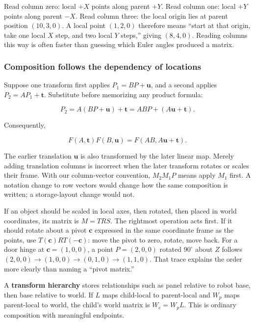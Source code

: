 Read column zero: local \(+X\) points along parent \(+Y\). Read column one: local \(+Y\) points along parent \(-X\). Read column three: the local origin lies at parent position \((10,3,0)\). A local point \((1,2,0)\) therefore means ``start at that origin, take one local \(X\) step, and two local \(Y\) steps,'' giving \((8,4,0)\). Reading columns this way is often faster than guessing which Euler angles produced a matrix.

\subsubsection{Composition follows the dependency of locations}\label{01-foundations-i-ch018-composition-follows-the-dependency-of-locations}

Suppose one transform first applies \(P_1=BP+\mathbf u\), and a second applies \(P_2=AP_1+\mathbf t\). Substitute before memorizing any product formula:

\[
P_2=A(BP+\mathbf u)+\mathbf t
=ABP+(A\mathbf u+\mathbf t).
\]

Consequently,

\[
F(A,\mathbf t)F(B,\mathbf u)
=F(AB,A\mathbf u+\mathbf t).
\]

The earlier translation \(\mathbf u\) is also transformed by the later linear map. Merely adding translation columns is incorrect when the later transform rotates or scales their frame. With our column-vector convention, \(M_2M_1P\) means apply \(M_1\) first. A notation change to row vectors would change how the same composition is written; a storage-layout change would not.

If an object should be scaled in local axes, then rotated, then placed in world coordinates, its matrix is \(M=TRS\). The rightmost operation acts first. If it should rotate about a pivot \(\mathbf c\) expressed in the same coordinate frame as the points, use \(T(\mathbf c)RT(-\mathbf c)\): move the pivot to zero, rotate, move back. For a door hinge at \(\mathbf c=(1,0,0)\), a point \(P=(2,0,0)\) rotated \(90^\circ\) about \(Z\) follows \((2,0,0)\to(1,0,0)\to(0,1,0)\to(1,1,0)\). That trace explains the order more clearly than naming a ``pivot matrix.''

A \textbf{transform hierarchy} stores relationships such as panel relative to robot base, then base relative to world. If \(L\) maps child-local to parent-local and \(W_p\) maps parent-local to world, the child's world matrix is \(W_c=W_pL\). This is ordinary composition with meaningful endpoints.

